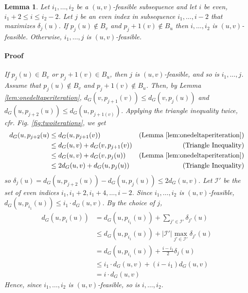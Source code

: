\documentclass[12pt]{article}
\newtheorem{lem}[thm]{Lemma}
\begin{document}
\begin{lem}
Let $i_1, \hdots, i_2$ be a $(u,v)$-feasible subsequence and let $i$ be even, $i_1+2 \leq i \leq i_2-2$. Let $j$ be an even index in subsequence $i_1, \hdots ,i-2$ that maximizes $\delta_j(u)$. If $p_j(u) \not\in B_v$ and $p_j+1(v) \not\in B_u$ then $i, \hdots , i_2$ is $(u,v)$-feasible. Otherwise, $i_1, \hdots , j$ is $(u,v)$-feasible.

\paragraph{Proof} If $p_j(u) \in B_v$ or $p_j+1(v) \in B_u$, then $j$ is $(u,v)$-feasible, and so is $i_1, \hdots, j$. Assume that $p_j(u) \not\in B_v$ and $p_j+1(v) \not\in B_u$. Then, by Lemma \ref{lem:onedeltaperiteration}, $d_G(v,p_{j+1}(v)) \leq d_G(v,p_{j}(u))$ and $d_G(u,p_{j+2}(u)) \leq d_G(u,p_{j+1(v)})$. Applying the triangle inequality twice, cfr. Fig. \ref{fig:twoiterations}, we get 
\begin{align*}
d_G(u,p_{j+2}(u) &\leq d_G(u,p_{j+1}(v)) &(\text{Lemma \ref{lem:onedeltaperiteration}}) \\
&\leq d_G(u,v) + d_G(v, p_{j+1}(v)) &(\text{Triangle Inequality})\\
&\leq d_G(u,v) + d_G(v, p_{j}(u)) &(\text{Lemma \ref{lem:onedeltaperiteration}})\\
&\leq 2d_G(u,v) + d_G(u, p_{j}(u))&(\text{Triangle Inequality})
\end{align*}
so $\delta_j(u) = d_G(u,p_{j+2}(u)) - d_G(u,p_j(u)) \leq 2d_G(u,v)$. Let $\mathcal{I}'$ be the set of even indices $i_1, i_1+2, i_1+4, \hdots, i-2$. Since $i_1, \hdots, i_2$ is $(u,v)$-feasible, $d_G(u,p_{i_1}(u)) \leq i_1 \cdot d_G(u,v)$. By the choice of $j$,
\begin{align*}
d_G(u,p_{i}(u)) &= d_G(u,p_{i_1}(u)) + \sum_{j' \in \mathcal{I'}}\delta_{j'}(u) \\
&\leq d_G(u,p_{i_1}(u)) + \left| \mathcal{I'} \right| \max_{j' \in \mathcal{I'}}\delta_{j'}(u) \\
&= d_G(u,p_{i_1}(u)) + \frac{i-i_1}{2} \delta_{j}(u) \\
&\leq i_1 \cdot d_G(u,v) + (i-i_1)d_G(u,v) \\
&= i \cdot d_G(u,v)
\end{align*}
Hence, since $i_1, \hdots, i_2$ is $(u,v)$-feasible, so is $i, \hdots, i_2$.  \label{lem:uvfeasibility}
\end{lem}
\end{document}
